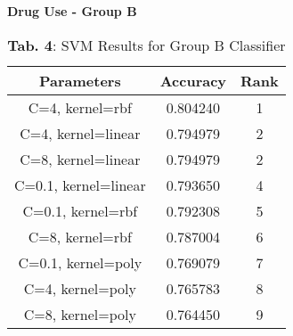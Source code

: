 \documentclass{article}
\begin{document}


\newpage


\textbf{Drug Use - Group B}

\vspace{0.5cm}

\begin{table}[h!]
 \centering 
\begin{tabular}{|c|c|c|}
\hline
\textbf{Parameters}          & \textbf{Accuracy} & \textbf{Rank} \\ \hline
C=4, kernel=rbf              & 0.804240          & 1             \\ \hline
C=4, kernel=linear           & 0.794979          & 2             \\ \hline
C=8, kernel=linear           & 0.794979          & 2             \\ \hline
C=0.1, kernel=linear         & 0.793650          & 4             \\ \hline
C=0.1, kernel=rbf            & 0.792308          & 5             \\ \hline
C=8, kernel=rbf              & 0.787004          & 6             \\ \hline
C=0.1, kernel=poly           & 0.769079          & 7             \\ \hline
C=4, kernel=poly             & 0.765783          & 8             \\ \hline
C=8, kernel=poly             & 0.764450          & 9             \\ \hline
\end{tabular}
\caption{\textbf{Tab. 4}: SVM Results for Group B Classifier}
\label{tab:svm_personality}
\end{table}

\vspace{1cm}
\end{document}
